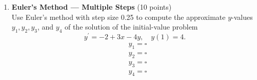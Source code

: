 \begin{enumerate}
  \item \textbf{Euler's Method --- Multiple Steps} (10 points)\\
  Use Euler's method with step size 0.25 to compute the approximate $y$-values $y_1, y_2, y_3$, and $y_4$ of the solution of the initial-value problem
  $$
  y^{\prime}=-2+3 x-4 y, \quad y(1)=4 .
  $$
  $$
  \begin{aligned}
  & y_1=\square \\
  & y_2=\square \\
  & y_3=\square \\
  & y_4=\square
  \end{aligned}
  $$
  \begin{subanswer}
  \end{subanswer}
\end{enumerate}
